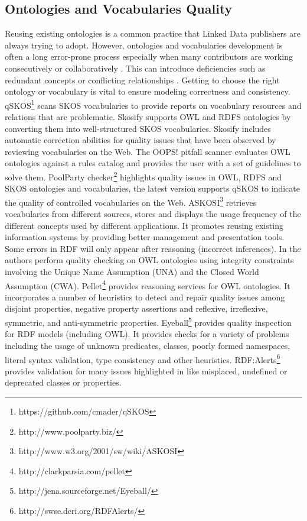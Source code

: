 \documentclass[onecolumn, crcready]{iosart2c}
\begin{document}
\subsection {Ontologies and Vocabularies Quality}
Reusing existing ontologies is a common practice that Linked Data publishers are always trying to adopt. However, ontologies and vocabularies development is often a long error-prone process especially when many contributors are working consecutively or collaboratively \cite{Suominen2013}. This can introduce deficiencies such as redundant concepts or conflicting relationships \cite{harpring_introduction_2010}. Getting to choose the right ontology or vocabulary is vital to ensure modeling correctness and consistency.\\ qSKOS\footnote{https://github.com/cmader/qSKOS} \cite{Mader2012} scans SKOS vocabularies to provide reports on vocabulary resources and relations that are problematic. Skosify \cite{Suominen:2012:IQS:2413941.2413985} supports OWL and RDFS ontologies by converting them into well-structured SKOS vocabularies. Skosify includes automatic correction abilities for quality issues that have been observed by reviewing vocabularies on the Web. The OOPS! pitfall scanner \cite{oops} evaluates OWL ontologies against a rules catalog and provides the user with a set of guidelines to solve them. PoolParty checker\footnote{http://www.poolparty.biz/} highlights quality issues in OWL, RDFS and SKOS ontologies and vocabularies, the latest version supports qSKOS to indicate the quality of controlled vocabularies on the Web. ASKOSI\footnote{http://www.w3.org/2001/sw/wiki/ASKOSI} retrieves vocabularies from different sources, stores and displays the usage frequency of the different concepts used by different applications. It promotes reusing existing information systems by providing better management and presentation tools.\\ Some errors in RDF will only appear after reasoning (incorrect inferences). In \cite{conf/owled/SirinSW08}\cite{conf/hicss/TaoDM09} the authors perform quality checking on OWL ontologies using integrity constraints involving the Unique Name Assumption (UNA) and the Closed World Assumption (CWA). Pellet\footnote{http://clarkparsia.com/pellet} provides reasoning services for OWL ontologies. It incorporates a number of heuristics to detect and repair quality issues among disjoint properties, negative property assertions and reflexive, irreflexive, symmetric, and anti-symmetric properties. Eyeball\footnote{http://jena.sourceforge.net/Eyeball/} provides quality inspection for RDF models (including OWL). It provides checks for a variety of problems including the usage of unknown predicates, classes, poorly formed namespaces, literal syntax validation, type consistency and other heuristics. RDF:Alerts\footnote{http://swse.deri.org/RDFAlerts/} provides validation for many issues highlighted in \cite{Hogan2010} like misplaced, undefined or deprecated classes or properties. 
\end{document}
